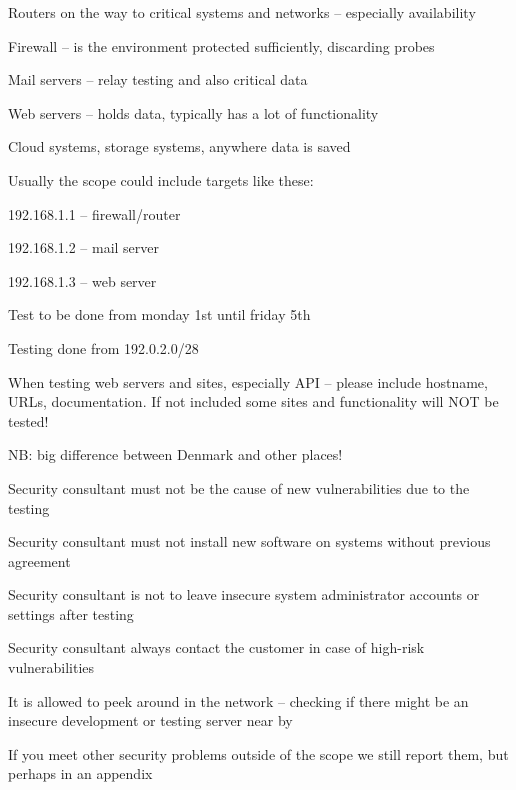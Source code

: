 \documentclass[Screen16to9,17pt]{foils}
\begin{document}


\begin{list2}
\item Routers on the way to critical systems and networks -- especially availability
\item Firewall -- is the environment protected sufficiently, discarding probes
\item Mail servers -- relay testing and also critical data
\item Web servers -- holds data, typically has a lot of functionality
\item Cloud systems, storage systems, anywhere data is saved
\end{list2}


\begin{list1}
\item Usually the scope could include targets like these:
\begin{list2}
\item 192.168.1.1 -- firewall/router
\item 192.168.1.2 -- mail server
\item 192.168.1.3 -- web server
\item Test to be done from monday 1st until friday 5th
\item Testing done from 192.0.2.0/28
\end{list2}
\item When testing web servers and sites, especially API -- please include hostname, URLs, documentation. If not included some sites and functionality will NOT be tested!
\end{list1}


\begin{list2}
\item NB: big difference between Denmark and other places!
\item Security consultant must not be the cause of new vulnerabilities due to the testing
\item Security consultant must not install new software on systems without previous agreement
\item Security consultant is not to leave insecure system administrator accounts or settings after testing
\item Security consultant always contact the customer in case of high-risk vulnerabilities
\item It is allowed to peek around in the network -- checking if there might be an insecure development or testing server near by
\item If you meet other security problems outside of the scope we still report them, but perhaps in an appendix
\end{list2}
\end{document}

